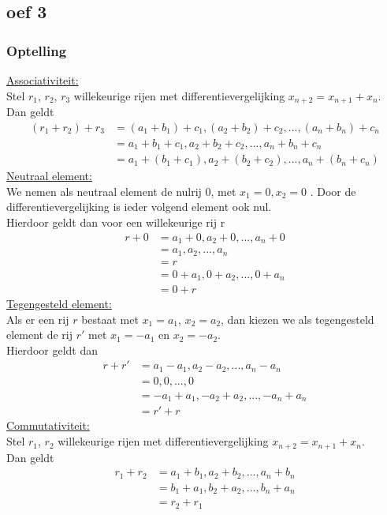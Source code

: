 \documentclass[10pt,a4paper]{article}
\begin{document}
\subsection*{oef 3}
\subsubsection*{Optelling}
\underline{Associativiteit:}\\
Stel $r_1$, $r_2$, $r_3$ willekeurige rijen met differentievergelijking $x_{n + 2} = x_{n + 1} + x_n$.\\
Dan geldt
\begin{align*}
    (r_1 + r_2) + r_3 &= (a_1 + b_1) + c_1 , (a_2 + b_2) + c_2 , ... , (a_n + b_n)+ c_n\\
    &= a_1 + b_1 + c_1, a_2 + b_2 + c_2, ... , a_n + b_n + c_n\\
    &= a_1 + (b_1 + c_1), a_2 + (b_2 + c_2), ..., a_n + (b_n + c_n)
\end{align*}
\underline{Neutraal element:}\\
We nemen als neutraal element de nulrij 0, met $x_1 = 0, x_2 = 0$ . 
Door de differentievergelijking is ieder volgend element ook nul.\\
Hierdoor geldt dan voor een willekeurige rij r
\begin{align*}
  r + 0 &= a_1 + 0, a_2 + 0, ..., a_n + 0\\
  &= a_1, a_2, ..., a_n\\
  &= r\\
  &= 0 + a_1, 0 + a_2, ..., 0 + a_n\\
  &= 0 + r
\end{align*}
\underline{Tegengesteld element:}\\
Als er een rij $r$ bestaat met $x_1 = a_1$, $x_2 = a_2$, dan kiezen we als tegengesteld element de rij $r'$ met $x_1 = -a_1$ en $x_2 = -a_2$.\\
Hierdoor geldt dan
\begin{align*}
    r + r' &= a_1 - a_1, a_2 - a_2, ...,a_n - a_n\\
    &= 0, 0, ..., 0\\
    &= -a_1 + a_1, -a_2 + a_2, ..., -a_n + a_n\\
    &= r' + r
\end{align*}
\underline{Commutativiteit:}\\
Stel $r_1$, $r_2$ willekeurige rijen met differentievergelijking $x_{n + 2} = x_{n + 1} + x_n$.\\
Dan geldt
\begin{align*}
    r_1 + r_2 &= a_1 + b_1, a_2 + b_2, ..., a_n + b_n\\
    &= b_1 + a_1, b_2 + a_2, ..., b_n + a_n\\
    &= r_2 + r_1
\end{align*}
\end{document}
